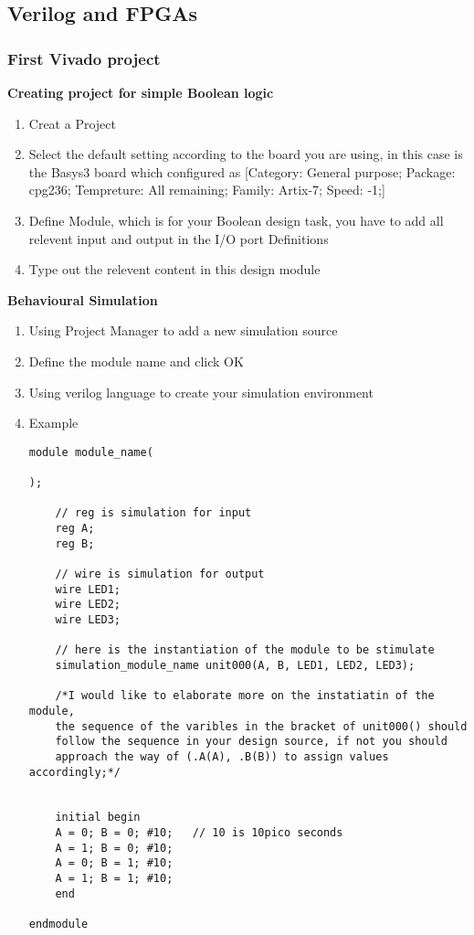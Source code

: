 \subsection{Verilog and FPGAs}   %
\subsubsection{First Vivado project}
\textbf{Creating project for simple Boolean logic}
\begin{enumerate}
    \item Creat a Project
    \item Select the default setting according to the board you are using, in this case is the Basys3 board which configured as [Category: General purpose; Package: cpg236; Tempreture: All remaining; Family: Artix-7; Speed: -1;]
    \item Define Module, which is for your Boolean design task, you have to add all relevent input and output in the I/O port Definitions
    \item Type out the relevent content in this design module
\end{enumerate}
\textbf{Behavioural Simulation}
\begin{enumerate}
    \item Using Project Manager to add a new simulation source
    \item Define the module name and click OK
    \item Using verilog language to create your simulation environment
    \item Example
    \begin{verbatim}
module module_name(

);

    // reg is simulation for input
    reg A;    
    reg B;

    // wire is simulation for output
    wire LED1;
    wire LED2;
    wire LED3;  

    // here is the instantiation of the module to be stimulate
    simulation_module_name unit000(A, B, LED1, LED2, LED3);

    /*I would like to elaborate more on the instatiatin of the module,
    the sequence of the varibles in the bracket of unit000() should
    follow the sequence in your design source, if not you should
    approach the way of (.A(A), .B(B)) to assign values accordingly;*/
    

    initial begin
    A = 0; B = 0; #10;   // 10 is 10pico seconds
    A = 1; B = 0; #10; 
    A = 0; B = 1; #10;
    A = 1; B = 1; #10; 
    end
    
endmodule
    \end{verbatim}
\end{enumerate}
